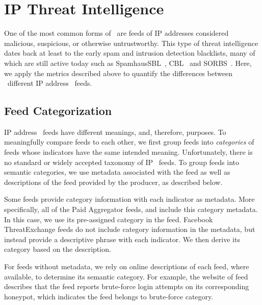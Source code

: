 \section{IP Threat Intelligence}
\label{sec:ip-analysis}

One of the most common forms of \ti\ are feeds of IP addresses considered malicious,
suspicious, or otherwise untrustworthy. This type of threat intelligence dates back
at least to the early spam and intrusion detection blacklists, many of which are
still active today such as SpamhausSBL~\cite{SpamhausSBL}, CBL~\cite{CBL} and
SORBS~\cite{SORBS}. Here, we apply the metrics described above to quantify the
differences between \numipfeeds\ different IP address \ti\ feeds.


\subsection{Feed Categorization}
IP address \ti\ feeds have different meanings, and, therefore, purposes. To
meaningfully compare feeds to each other, we first group feeds into
\emph{categories} of feeds whose indicators have the same intended meaning.
Unfortunately, there is no standard or widely accepted taxonomy of IP \ti\ feeds.
To group feeds into semantic categories, we use metadata associated with the
feed as well as descriptions of the feed provided by the producer, as described below.

 Some feeds provide category information with each indicator as
metadata. More specifically, all of the {Paid Aggregator} feeds, {\feedalienvault}
and {\feedetiprep} include this category metadata. In this case, we use its pre-assigned
category in the feed. Facebook ThreatExchange feeds do not include category
information in the metadata, but instead provide a descriptive phrase with each indicator.
We then derive its category based on the description.

 For feeds without metadata, we rely on online descriptions
of each feed, where available, to determine its semantic category. For example, the
website of feed {\feednothink}~\cite{Nothink} describes that the feed reports brute-force
login attempts on its corresponding honeypot, which indicates the feed belongs to
brute-force category.

